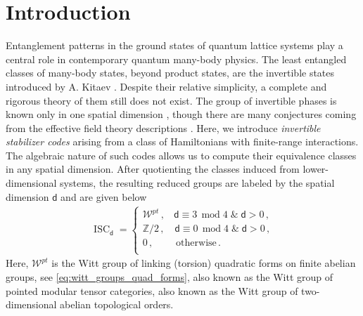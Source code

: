 \documentclass[sn-mathphys-num]{sn-jnl}
\theoremstyle{definition}
\numberwithin{equation}{section}
\theoremstyle{definition}
\def\CW {{\mathcal W}}
\def\IZ{{\mathbb{Z}}}
\newcommand{\dd}{{\mathsf{d}}} %
\begin{document}
\section{Introduction}\label{sec:intro}
Entanglement patterns in the ground states of quantum lattice systems play a central role in contemporary quantum many-body physics. The least entangled classes of many-body states, beyond product states, are the invertible states introduced by A. Kitaev \cite{Kitaev}. Despite their relative simplicity, a complete and rigorous theory of them still does not exist. The group of invertible phases is known only in one spatial dimension \cite{Kapustin_2021}, though there are many conjectures coming from the effective field theory descriptions \cite{kapustin2014symmetryprotectedtopologicalphases,xiong2018minimalist,Gaiotto_2019,Freed_2021,Shiozaki2022,kubota2025stablehomotopytheoryinvertible}. Here, we introduce \textit{invertible stabilizer codes} arising from a class of Hamiltonians with finite-range interactions. The algebraic nature of such codes allows us to compute their equivalence classes in any spatial dimension. After quotienting the classes induced from lower-dimensional systems,
the resulting reduced groups are labeled by the spatial dimension
$\dd$ and are given below
\begin{align}\label{eq:phases}
\operatorname{ISC}_\dd=\begin{cases}\CW^{pt}\,,\;\;\,\, \dd\equiv 3\;\,\mbox{mod}\;4\; \&\; \dd>0\,,\\
  \IZ/2\,,\quad \dd\equiv 0\;\,\mbox{mod}\;4\; \&\; \dd>0\,,\\
  0\,,\quad\quad\; \mbox{otherwise}\,.\\
  \end{cases}
\end{align}
Here, $\CW^{pt}$ is the Witt group of linking (torsion) quadratic forms on finite abelian groups, see \eqref{eq:witt_groups_quad_forms}, also known as the Witt group of pointed modular tensor categories, also known as the Witt group of two-dimensional abelian topological orders. 
\end{document}
